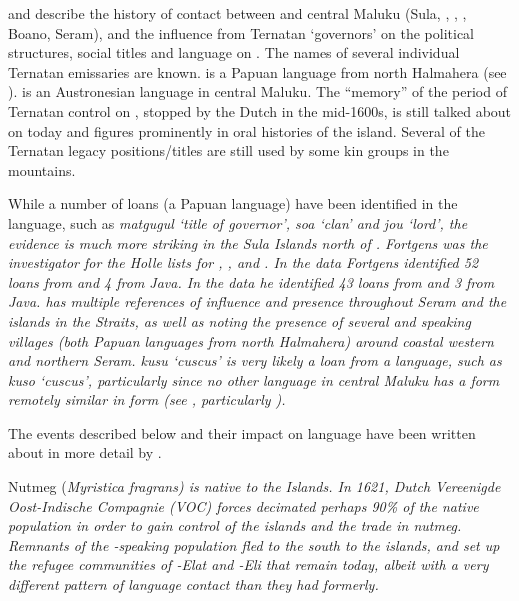 \citet{vanFraassen1987} and
\citet[15--31, 146, 159--160]{Grimes1993}
describe the history of contact
between  and central Maluku (Sula,
, , , Boano,
Seram), and the influence from Ternatan ‘governors’ on the political
structures, social titles and language on .
The names of several individual Ternatan emissaries are known.
 is a Papuan language from north Halmahera (see ).
 is an Austronesian language in central Maluku.
The “memory” of the period of Ternatan control on ,
stopped by the Dutch in the mid-1600s,
is still talked about on  today
and figures prominently in oral histories of the island.
Several of the Ternatan legacy positions/titles are still used
by some kin groups in the mountains.

While a number of  loans (a Papuan language) have been
identified in the  language,
such as \it{matgugul} ‘title of  governor’,
\it{soa} ‘clan’ and \it{jou} ‘lord’, the evidence is much more
striking in the Sula Islands north of .
Fortgens was the investigator for the Holle lists for ,
, and  \citep{Stokhof1980b}.
In the  data Fortgens identified 52 loans from 
and 4 from Java.
In the  data he identified 43 loans from 
and 3 from Java.
\citet{Collins1982c} has multiple references of  influence
and presence throughout Seram
and the islands in the  Straits,
as well as noting the presence of several 
and  speaking villages (both Papuan languages from north
Halmahera) around coastal western and northern Seram.
  \it{kusu} ‘cuscus’ is very likely a loan from a  language, such as  \it{kuso} ‘cuscus’,
particularly since no other language in central Maluku has a
form remotely similar in form (see , particularly ).

The events described below
and their impact on language have been written about in more detail by
\citet{Grimes1994,Collins2003b,MusgraveEwing2006,Grimes2010b}.

Nutmeg (\it{Myristica fragrans}) is native to the  Islands.
In 1621, Dutch \it{Vereenigde Oost-Indische Compagnie} (VOC)
forces decimated perhaps 90{\%} of the native population in order
to gain control of the islands
and the trade in nutmeg.
Remnants of the -speaking population fled to the south
to the  islands,
and set up the refugee communities of -Elat
and -Eli that remain today,
albeit with a very different pattern of language contact than they had formerly.


